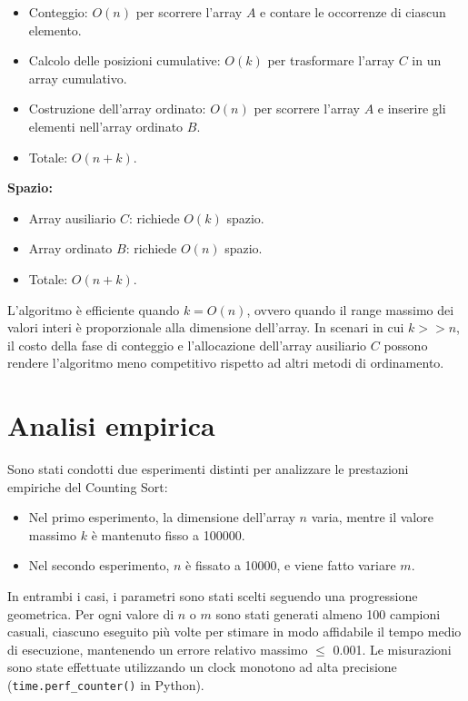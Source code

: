 \documentclass[a4paper, 12pt, oneside]{book}
\begin{document}
\begin{itemize}
    \item Conteggio: \(O(n)\) per scorrere l'array \(A\) e contare le occorrenze di ciascun elemento.
    \item Calcolo delle posizioni cumulative: \(O(k)\) per trasformare l'array \(C\) in un array cumulativo.
    \item Costruzione dell'array ordinato: \(O(n)\) per scorrere l'array \(A\) e inserire gli elementi nell'array ordinato \(B\).
    \item Totale: \(O(n + k)\).
\end{itemize}

\noindent \textbf{Spazio:}

\begin{itemize}
    \item Array ausiliario \(C\): richiede \(O(k)\) spazio.
    \item Array ordinato \(B\): richiede \(O(n)\) spazio.
    \item Totale: \(O(n + k)\).
\end{itemize}

\noindent L'algoritmo è efficiente quando \(k = O(n)\), ovvero quando il range massimo dei valori interi è proporzionale alla dimensione dell'array.
In scenari in cui \(k >> n\), il costo della fase di conteggio e l'allocazione dell'array ausiliario \(C\) possono rendere l'algoritmo meno competitivo rispetto ad altri metodi di ordinamento.

\section{Analisi empirica}

Sono stati condotti due esperimenti distinti per analizzare le prestazioni empiriche del Counting Sort:

\begin{itemize}
    \item Nel primo esperimento, la dimensione dell'array \(n\) varia, mentre il valore massimo \(k\) è mantenuto fisso a 100000.
    \item Nel secondo esperimento, \(n\) è fissato a 10000, e viene fatto variare \(m\).
\end{itemize}

\noindent In entrambi i casi, i parametri sono stati scelti seguendo una progressione geometrica.
Per ogni valore di \(n\) o \(m\) sono stati generati almeno 100 campioni casuali, ciascuno eseguito più volte per stimare in modo affidabile il tempo medio di esecuzione, mantenendo un errore relativo massimo \(\leq\) 0.001.
Le misurazioni sono state effettuate utilizzando un clock monotono ad alta precisione (\texttt{time.perf\_counter()} in Python).
\end{document}
